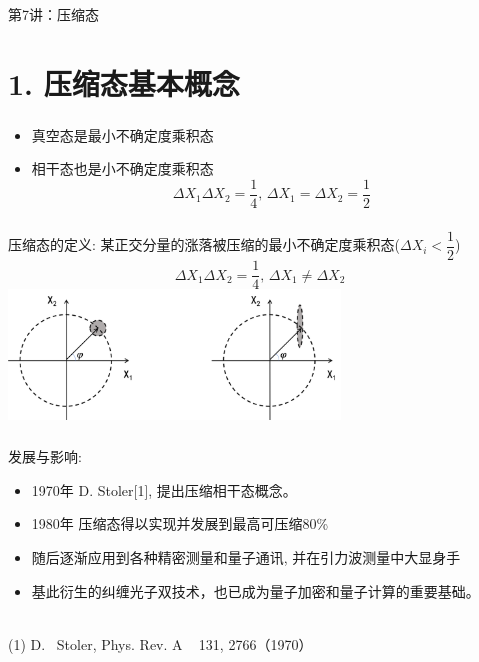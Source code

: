 \begin{frame} [plain]
    \frametitle{}
    \Background[1] 
    \begin{center}
    {\huge 第7讲：压缩态}
    \end{center}  
    \addtocounter{framenumber}{-1}   
\end{frame}

\section{1. 压缩态基本概念}

\begin{frame}
    \frametitle{}
    \begin{tcolorbox3}[前情回顾]
     \begin{itemize}
                \item 真空态是最小不确定度乘积态
                \item 相干态也是小不确定度乘积态
                \[ \Delta X_1 \Delta X_2 =\dfrac{1}{4}, \, \Delta X_1 = \Delta X_2 = \frac{1}{2} \] 
         \end{itemize}
    \end{tcolorbox3}
\end{frame}

\begin{frame}
 \frametitle{}
      \begin{center}
           \begin{tcolorbox2}[0.86]{压缩态的定义:}
            某正交分量的涨落被压缩的最小不确定度乘积态($\Delta X_i < \dfrac{1}{2}$)
            \[ \Delta X_1 \Delta X_2 =\dfrac{1}{4}, \, \Delta X_1 \not = \Delta X_2  \] 
            \centering
            \includegraphics[width=0.66\textwidth]{figs/6.png}
          \end{tcolorbox2}  
      \end{center} 
\end{frame}

\begin{frame}
 \frametitle{}
 发展与影响:
 \begin{itemize}
     \item  1970年 D. Stoler[1], 提出压缩相干态概念。
     \item  1980年 压缩态得以实现并发展到最高可压缩80\%
     \item  随后逐渐应用到各种精密测量和量子通讯, 并在引力波测量中大显身手 
     \item 基此衍生的纠缠光子双技术，也已成为量子加密和量子计算的重要基础。
 \end{itemize}
 ~~ \\ {\vspace*{2.8em}}
 (1) D. ~Stoler, Phys. Rev.  A ~ 131, 2766（1970）    
\end{frame}

